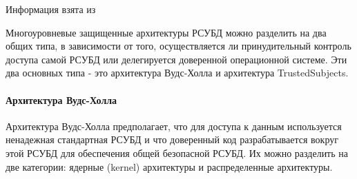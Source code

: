 Информация взята из \autocite{Rjaibi}

Многоуровневые защищенные архитектуры РСУБД можно разделить на два общих типа, в зависимости от того,
осуществляется ли принудительный контроль доступа самой РСУБД или делегируется доверенной операционной системе.
Эти два основных типа - это архитектура Вудс-Холла и архитектура TrustedSubjects.
\paragraph  {Архитектура Вудс-Холла}
Архитектура Вудс-Холла предполагает, что для доступа к данным используется ненадежная стандартная РСУБД
и что доверенный код разрабатывается вокруг этой РСУБД для обеспечения общей безопасной РСУБД.
Их можно разделить на две категории: ядерные (kernel) архитектуры и распределенные архитектуры.
